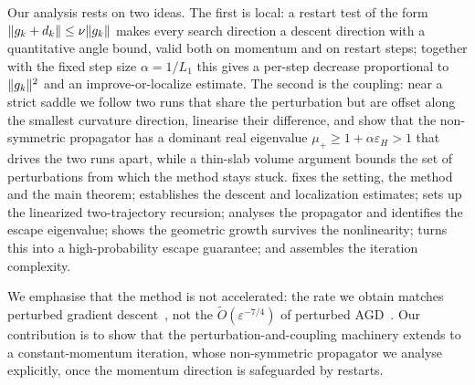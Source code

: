 \documentclass[11pt]{article}
\theoremstyle{plain}
\theoremstyle{definition}
\theoremstyle{remark}
\DeclarePairedDelimiter{\norm}{\lVert}{\rVert}
\newcommand{\eps}{\varepsilon}
\newcommand{\epsH}{\eps_{H}}
\newcommand{\mup}{\mu_{+}}
\newcommand{\Otil}{\widetilde{O}}
\begin{document}
Our analysis rests on two ideas. The first is local: a restart test of
the form $\norm{g_{k}+d_{k}}\le\nu\norm{g_{k}}$ makes every search
direction a descent direction with a quantitative angle bound, valid
both on momentum and on restart steps;
together with the fixed step size $\alpha=1/L_{1}$ this gives a per-step
decrease proportional to $\norm{g_{k}}^{2}$ and an improve-or-localize
estimate. The second is the coupling: near a strict saddle we follow two
runs that share the perturbation but are offset along the smallest
curvature direction, linearise their difference, and show that the
non-symmetric propagator has a dominant real eigenvalue
$\mup\ge1+\alpha\epsH>1$ that drives the two runs apart, while a
thin-slab volume argument bounds the set of perturbations from which the
method stays stuck.  fixes the setting, the method and
the main theorem;  establishes the descent and
localization estimates;  sets up the linearized
two-trajectory recursion;  analyses the propagator
and identifies the escape eigenvalue;  shows the
geometric growth survives the nonlinearity;  turns this
into a high-probability escape guarantee; and 
assembles the iteration complexity.

We emphasise that the method is not accelerated: the rate we obtain
matches perturbed gradient descent~\cite{pmlr-v70-jin17a}, not the
$\Otil(\eps^{-7/4})$ of perturbed AGD~\cite{pmlr-v75-jin18a}. Our contribution is
to show that the perturbation-and-coupling machinery extends to a
constant-momentum iteration, whose non-symmetric propagator we analyse
explicitly, once the momentum direction is safeguarded by restarts.
\end{document}
